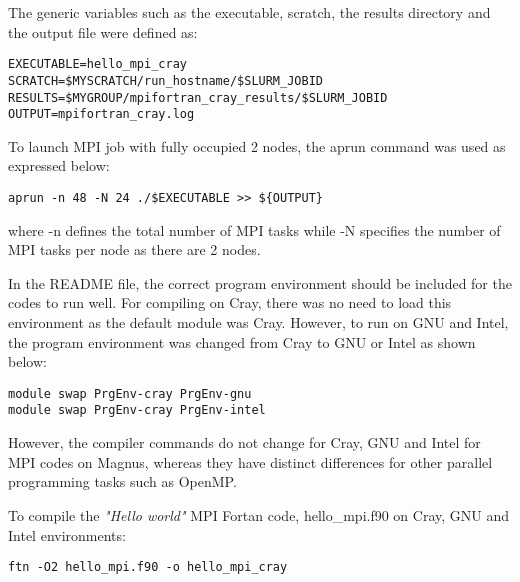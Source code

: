 The generic variables such as the executable, scratch, the results directory and the output file were defined as:

\begin{tcolorbox}
\begin{Verbatim}[fontsize=\stripsize]
EXECUTABLE=hello_mpi_cray
SCRATCH=$MYSCRATCH/run_hostname/$SLURM_JOBID
RESULTS=$MYGROUP/mpifortran_cray_results/$SLURM_JOBID
OUTPUT=mpifortran_cray.log 
\end{Verbatim}
\end{tcolorbox}


To launch MPI job with fully occupied 2 nodes, the aprun command was used as expressed below:

\begin{tcolorbox}
\begin{Verbatim}[fontsize=\stripsize]
aprun -n 48 -N 24 ./$EXECUTABLE >> ${OUTPUT}
\end{Verbatim}
\end{tcolorbox}

where -n defines the total number of MPI tasks while -N specifies the number of MPI tasks per node as there are 2 nodes.

In the README file, the correct program environment should be included for the codes to run well. For compiling on Cray, there was no need to load
this environment as the default module was Cray. However, to run on GNU and Intel, the program environment was changed from Cray to GNU or Intel as
shown below:

\begin{tcolorbox}
\begin{Verbatim}[fontsize=\stripsize]
module swap PrgEnv-cray PrgEnv-gnu
module swap PrgEnv-cray PrgEnv-intel
\end{Verbatim}
\end{tcolorbox}

However, the compiler commands do not change for Cray, GNU and Intel for MPI codes on Magnus, whereas they have distinct differences for other parallel
programming tasks such as OpenMP.

To compile the \emph{"Hello world"} MPI Fortan code, hello\_mpi.f90 on Cray, GNU and Intel environments:

\begin{tcolorbox}
\begin{verbatim}
ftn -O2 hello_mpi.f90 -o hello_mpi_cray
\end{verbatim}
\end{tcolorbox}

